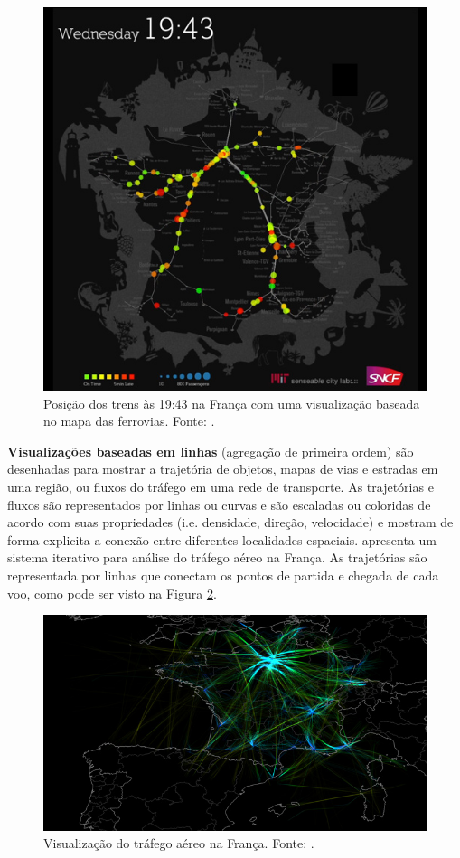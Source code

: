 \begin{figure}[!htb]
  \centering
  \includegraphics[width=.6\textwidth]{../figuras/trains-of-data.jpg}
  \caption[Visualização baseada no mapa das ferrovias da França]{Posição dos trens às 19:43 na França com uma visualização baseada no mapa
das ferrovias. Fonte: \citet{Senseable2018}.}
  \label{fig:trains-of-data}
\end{figure}

\textbf{Visualizações baseadas em linhas} (agregação de primeira ordem) são
desenhadas para mostrar a trajetória de objetos, mapas de vias e estradas em
uma região, ou fluxos do tráfego em uma rede de transporte. As trajetórias e
fluxos são representados por linhas ou curvas e são escaladas ou coloridas de
acordo com suas propriedades (i.e. densidade, direção, velocidade) e mostram de forma
explicita a conexão entre diferentes localidades espaciais. \citet{Klein2014} apresenta
um sistema iterativo para análise do tráfego aéreo na França. As trajetórias são
representada por linhas que conectam os pontos de partida e chegada de cada voo,
como pode ser visto na Figura \ref{fig:air-traffic}.

\begin{figure}[!htb]
  \centering
  \includegraphics[width=1\textwidth]{../figuras/air-traffic.png}
  \caption[Visualização do tráfego aéreo na França]{Visualização do tráfego aéreo na França. Fonte: \citet{Klein2014}.}
  \label{fig:air-traffic}
\end{figure}

